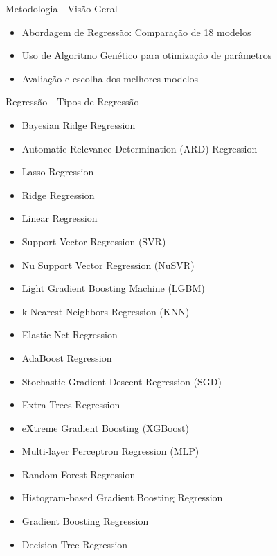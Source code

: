 \documentclass{beamer}
\begin{document}
\begin{frame}{Metodologia - Visão Geral}
    \begin{itemize}
        \item Abordagem de Regressão: Comparação de 18 modelos
        \item Uso de Algoritmo Genético para otimização de parâmetros
        \item Avaliação e escolha dos melhores modelos
    \end{itemize}
\end{frame}

\begin{frame}{Regressão - Tipos de Regressão}
    \begin{footnotesize}
        \begin{itemize}
            \item {Bayesian Ridge Regression}
            \item {Automatic Relevance Determination (ARD) Regression}
            \item {Lasso Regression}
            \item {Ridge Regression}
            \item {Linear Regression}
            \item {Support Vector Regression (SVR)}
            \item {Nu Support Vector Regression (NuSVR)}
            \item {Light Gradient Boosting Machine (LGBM)}
            \item {k-Nearest Neighbors Regression (KNN)}
            \item {Elastic Net Regression}
            \item {AdaBoost Regression}
            \item {Stochastic Gradient Descent Regression (SGD)}
            \item {Extra Trees Regression}
            \item {eXtreme Gradient Boosting (XGBoost)}
            \item {Multi-layer Perceptron Regression (MLP)}
            \item {Random Forest Regression}
            \item {Histogram-based Gradient Boosting Regression}
            \item {Gradient Boosting Regression}
            \item {Decision Tree Regression}
        \end{itemize}
    \end{footnotesize}
\end{frame}
\end{document}
